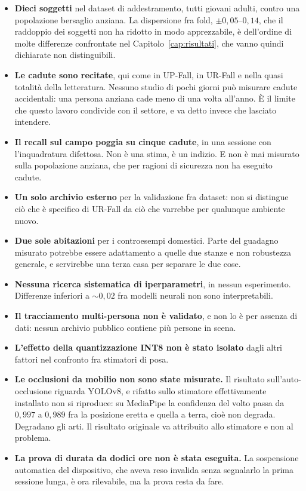 \begin{itemize}
  \item \textbf{Dieci soggetti} nel dataset di addestramento, tutti giovani adulti, contro una popolazione bersaglio anziana. La dispersione fra fold, $\pm 0{,}05$--$0{,}14$, che il raddoppio dei soggetti non ha ridotto in modo apprezzabile, è dell'ordine di molte differenze confrontate nel Capitolo~\ref{cap:risultati}, che vanno quindi dichiarate non distinguibili.

  \item \textbf{Le cadute sono recitate}, qui come in UP-Fall, in UR-Fall e nella quasi totalità della letteratura. Nessuno studio di pochi giorni può misurare cadute accidentali: una persona anziana cade meno di una volta all'anno. È il limite che questo lavoro condivide con il settore, e va detto invece che lasciato intendere.

  \item \textbf{Il recall sul campo poggia su cinque cadute}, in una sessione con l'inquadratura difettosa. Non è una stima, è un indizio. E non è mai misurato sulla popolazione anziana, che per ragioni di sicurezza non ha eseguito cadute.

  \item \textbf{Un solo archivio esterno} per la validazione fra dataset: non si distingue ciò che è specifico di UR-Fall da ciò che varrebbe per qualunque ambiente nuovo.

  \item \textbf{Due sole abitazioni} per i controesempi domestici. Parte del guadagno misurato potrebbe essere adattamento a quelle due stanze e non robustezza generale, e servirebbe una terza casa per separare le due cose.

  \item \textbf{Nessuna ricerca sistematica di iperparametri}, in nessun esperimento. Differenze inferiori a $\sim 0{,}02$ fra modelli neurali non sono interpretabili.

  \item \textbf{Il tracciamento multi-persona non è validato}, e non lo è per assenza di dati: nessun archivio pubblico contiene più persone in scena.

  \item \textbf{L'effetto della quantizzazione INT8 non è stato isolato} dagli altri fattori nel confronto fra stimatori di posa.

  \item \textbf{Le occlusioni da mobilio non sono state misurate.} Il risultato sull'auto-occlusione riguarda YOLOv8, e rifatto sullo stimatore effettivamente installato non si riproduce: su MediaPipe la confidenza del volto passa da $0{,}997$ a $0{,}989$ fra la posizione eretta e quella a terra, cioè non degrada. Degradano gli arti. Il risultato originale va attribuito allo stimatore e non al problema.

  \item \textbf{La prova di durata da dodici ore non è stata eseguita.} La sospensione automatica del dispositivo, che aveva reso invalida senza segnalarlo la prima sessione lunga, è ora rilevabile, ma la prova resta da fare.
\end{itemize}

